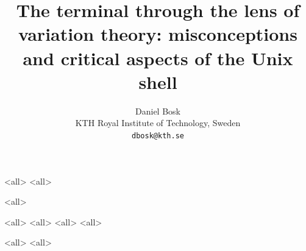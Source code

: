 \documentclass[ignoreframetext]{beamer}
\begin{document}
\title{%
  The terminal through the lens of variation theory:
  misconceptions and critical aspects of the Unix shell%
}
\author{%
  Daniel Bosk
  \\KTH Royal Institute of Technology, Sweden
  \\\texttt{dbosk@kth.se}
}

\mode*

\begin{frame}
  \maketitle
\end{frame}

\begin{abstract}
  
\end{abstract}

\begin{frame}
  \tableofcontents[subsectionstyle=hide,subsubsectionstyle=hide]
\end{frame}

\mode<all>{}
\mode<all>{}

\mode<all>{}

\mode<all>{}
\mode<all>{}
\mode<all>{}
\mode<all>{}

\mode<all>{}
\mode<all>{}

\begin{frame}[allowframebreaks]
\printbibliography
\end{frame}
\end{document}
